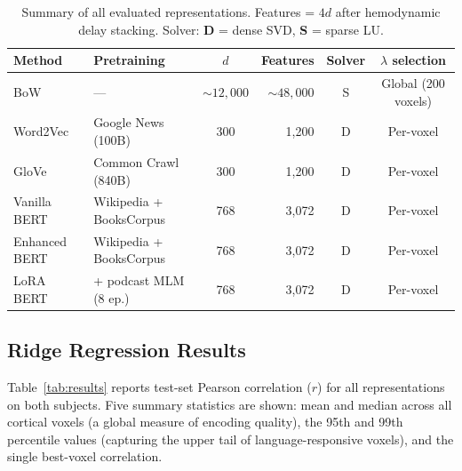 \begin{table}[htbp]
  \centering
  \caption{Summary of all evaluated representations. Features = $4d$ after
           hemodynamic delay stacking. Solver: \textbf{D} = dense SVD,
           \textbf{S} = sparse LU.}
  \label{tab:methods}
  \begin{tabular}{llcrcc}
    \toprule
    Method & Pretraining & $d$ & Features & Solver & $\lambda$ selection \\
    \midrule
    BoW           & ---                    & ${\sim}12{,}000$ & ${\sim}48{,}000$ & S & Global (200 voxels) \\
    Word2Vec      & Google News (100B)     & 300              & 1{,}200          & D & Per-voxel \\
    GloVe         & Common Crawl (840B)    & 300              & 1{,}200          & D & Per-voxel \\
    Vanilla BERT  & Wikipedia + BooksCorpus & 768             & 3{,}072          & D & Per-voxel \\
    Enhanced BERT & Wikipedia + BooksCorpus & 768             & 3{,}072          & D & Per-voxel \\
    LoRA BERT     & + podcast MLM (8 ep.)  & 768              & 3{,}072          & D & Per-voxel \\
    \bottomrule
  \end{tabular}
\end{table}


\subsection{Ridge Regression Results}
\label{sec:ridge_results}

Table~\ref{tab:results} reports test-set Pearson correlation ($r$) for all
representations on both subjects.  Five summary statistics are shown: mean and
median across all cortical voxels (a global measure of encoding quality),
the 95th and 99th percentile values (capturing the upper tail of
language-responsive voxels), and the single best-voxel correlation.

